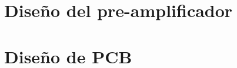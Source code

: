 \section{Diseño del pre-amplificador}
\resetallcounters

\clearpage


\section{Diseño de PCB}
\resetallcounters

\clearpage


